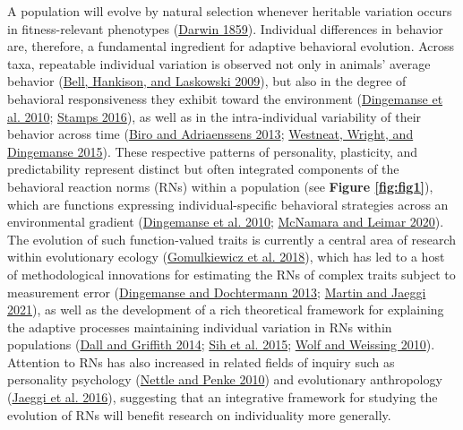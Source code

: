 \documentclass{article}
\begin{document}
A population will evolve by natural selection whenever heritable
variation occurs in fitness-relevant phenotypes
(\protect\hyperlink{ref-Darwin}{Darwin 1859}). Individual differences in
behavior are, therefore, a fundamental ingredient for adaptive
behavioral evolution. Across taxa, repeatable individual variation is
observed not only in animals' average behavior
(\protect\hyperlink{ref-Bell2009}{Bell, Hankison, and Laskowski 2009}),
but also in the degree of behavioral responsiveness they exhibit toward
the environment (\protect\hyperlink{ref-Ding2010}{Dingemanse et al.
2010}; \protect\hyperlink{ref-Stamps2016}{Stamps 2016}), as well as in
the intra-individual variability of their behavior across time
(\protect\hyperlink{ref-Biro2013}{Biro and Adriaenssens 2013};
\protect\hyperlink{ref-Westneat2015}{Westneat, Wright, and Dingemanse
2015}). These respective patterns of personality, plasticity, and
predictability represent distinct but often integrated components of the
behavioral reaction norms (RNs) within a population (see \textbf{Figure
\ref{fig:fig1}}), which are functions expressing individual-specific
behavioral strategies across an environmental gradient
(\protect\hyperlink{ref-Ding2010}{Dingemanse et al. 2010};
\protect\hyperlink{ref-McNamara2020}{McNamara and Leimar 2020}). The
evolution of such function-valued traits is currently a central area of
research within evolutionary ecology
(\protect\hyperlink{ref-Gomulk2018}{Gomulkiewicz et al. 2018}), which
has led to a host of methodological innovations for estimating the RNs
of complex traits subject to measurement error
(\protect\hyperlink{ref-DingDocht2013}{Dingemanse and Dochtermann 2013};
\protect\hyperlink{ref-Martin2021}{Martin and Jaeggi 2021}), as well as
the development of a rich theoretical framework for explaining the
adaptive processes maintaining individual variation in RNs within
populations (\protect\hyperlink{ref-Dall2014}{Dall and Griffith 2014};
\protect\hyperlink{ref-Sih2015}{Sih et al. 2015};
\protect\hyperlink{ref-Wolf2010}{Wolf and Weissing 2010}). Attention to
RNs has also increased in related fields of inquiry such as personality
psychology (\protect\hyperlink{ref-Nettle2010}{Nettle and Penke 2010})
and evolutionary anthropology (\protect\hyperlink{ref-Jaeggi2016}{Jaeggi
et al. 2016}), suggesting that an integrative framework for studying the
evolution of RNs will benefit research on individuality more generally.
\end{document}

